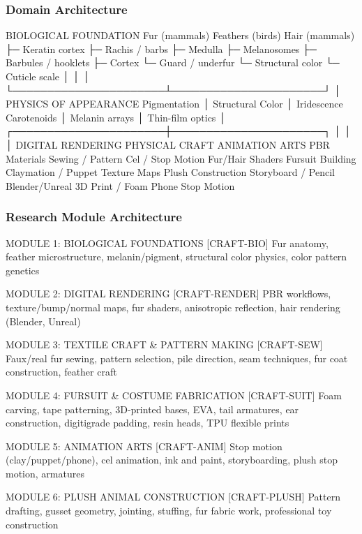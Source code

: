 \documentclass[11pt,letterpaper]{article}
\begin{document}
\subsubsection{Domain Architecture}

\begin{asciibox}
BIOLOGICAL FOUNDATION
  Fur (mammals)         Feathers (birds)        Hair (mammals)
  ├─ Keratin cortex     ├─ Rachis / barbs        ├─ Medulla
  ├─ Melanosomes        ├─ Barbules / hooklets   ├─ Cortex
  └─ Guard / underfur   └─ Structural color      └─ Cuticle scale
         │                      │                      │
         └──────────────────────┴──────────────────────┘
                                │
                    PHYSICS OF APPEARANCE
              Pigmentation │ Structural Color │ Iridescence
              Carotenoids  │ Melanin arrays   │ Thin-film optics
                                │
         ┌──────────────────────┼──────────────────────┐
         │                      │                      │
  DIGITAL RENDERING      PHYSICAL CRAFT         ANIMATION ARTS
  PBR Materials          Sewing / Pattern       Cel / Stop Motion
  Fur/Hair Shaders       Fursuit Building       Claymation / Puppet
  Texture Maps           Plush Construction     Storyboard / Pencil
  Blender/Unreal         3D Print / Foam        Phone Stop Motion
\end{asciibox}

\subsubsection{Research Module Architecture}

\begin{asciibox}
MODULE 1: BIOLOGICAL FOUNDATIONS         [CRAFT-BIO]
  Fur anatomy, feather microstructure, melanin/pigment,
  structural color physics, color pattern genetics

MODULE 2: DIGITAL RENDERING              [CRAFT-RENDER]
  PBR workflows, texture/bump/normal maps, fur shaders,
  anisotropic reflection, hair rendering (Blender, Unreal)

MODULE 3: TEXTILE CRAFT & PATTERN MAKING [CRAFT-SEW]
  Faux/real fur sewing, pattern selection, pile direction,
  seam techniques, fur coat construction, feather craft

MODULE 4: FURSUIT & COSTUME FABRICATION  [CRAFT-SUIT]
  Foam carving, tape patterning, 3D-printed bases, EVA,
  tail armatures, ear construction, digitigrade padding,
  resin heads, TPU flexible prints

MODULE 5: ANIMATION ARTS                 [CRAFT-ANIM]
  Stop motion (clay/puppet/phone), cel animation, ink
  and paint, storyboarding, plush stop motion, armatures

MODULE 6: PLUSH ANIMAL CONSTRUCTION      [CRAFT-PLUSH]
  Pattern drafting, gusset geometry, jointing, stuffing,
  fur fabric work, professional toy construction
\end{asciibox}
\end{document}
